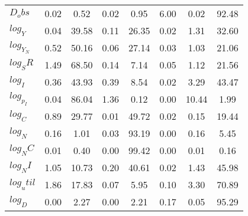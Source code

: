 \begin{center}
\begin{longtable}{lccccccc}
$D_obs     $	 & 	        0.02	 & 	        0.52	 & 	        0.02	 & 	        0.95	 & 	        6.00	 & 	        0.02	 & 	       92.48 \\ 
$log_Y     $	 & 	        0.04	 & 	       39.58	 & 	        0.11	 & 	       26.35	 & 	        0.02	 & 	        1.31	 & 	       32.60 \\ 
$log_Y_N   $	 & 	        0.52	 & 	       50.16	 & 	        0.06	 & 	       27.14	 & 	        0.03	 & 	        1.03	 & 	       21.06 \\ 
$log_SR    $	 & 	        1.49	 & 	       68.50	 & 	        0.14	 & 	        7.14	 & 	        0.05	 & 	        1.12	 & 	       21.56 \\ 
$log_I     $	 & 	        0.36	 & 	       43.93	 & 	        0.39	 & 	        8.54	 & 	        0.02	 & 	        3.29	 & 	       43.47 \\ 
$log_p_I   $	 & 	        0.04	 & 	       86.04	 & 	        1.36	 & 	        0.12	 & 	        0.00	 & 	       10.44	 & 	        1.99 \\ 
$log_C     $	 & 	        0.89	 & 	       29.77	 & 	        0.01	 & 	       49.72	 & 	        0.02	 & 	        0.15	 & 	       19.44 \\ 
$log_N     $	 & 	        0.16	 & 	        1.01	 & 	        0.03	 & 	       93.19	 & 	        0.00	 & 	        0.16	 & 	        5.45 \\ 
$log_NC    $	 & 	        0.01	 & 	        0.40	 & 	        0.00	 & 	       99.42	 & 	        0.00	 & 	        0.01	 & 	        0.16 \\ 
$log_NI    $	 & 	        1.05	 & 	       10.73	 & 	        0.20	 & 	       40.61	 & 	        0.02	 & 	        1.43	 & 	       45.98 \\ 
$log_util  $	 & 	        1.86	 & 	       17.83	 & 	        0.07	 & 	        5.95	 & 	        0.10	 & 	        3.30	 & 	       70.89 \\ 
$log_D     $	 & 	        0.00	 & 	        2.27	 & 	        0.00	 & 	        2.21	 & 	        0.17	 & 	        0.05	 & 	       95.29 \\ 
\end{longtable}
 \end{center}
